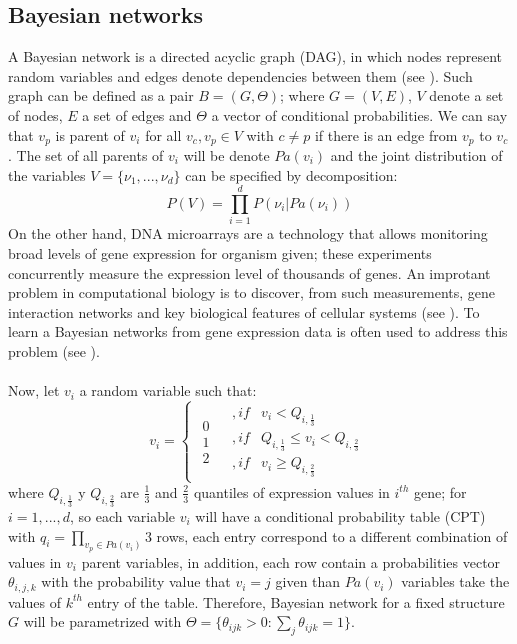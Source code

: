 \documentclass{bmcart}
\begin{document}
\subsection*{Bayesian networks}
A Bayesian network is a directed acyclic graph (DAG), in which nodes represent random variables and edges denote dependencies between them (see \cite{Pearl:1988:PRI:52121,pmid23375235}).  Such graph can be defined as a pair $B=(G,\Theta)$; where $G=(V,E)$, $V$ denote a set of nodes, $E$ a set of edges and $\Theta$ a vector of conditional probabilities. We can say that $v_{p}$ is parent of $v_{i}$ for all $v_{c},v_{p}\in V$ with $c\neq p$ if there is an edge from $v_{p}$ to $v_{c}$. The set of all parents of $v_{i}$ will be denote $Pa(v_{i})$ and the joint distribution of the variables $V=\{\nu_{1},...,\nu_{d}\}$ can be specified by decomposition:
\begin{equation}
P(V)=\prod_{i=1}^{d}P(\nu_{i}|Pa(\nu_{i}))\label{eq:1}
\end{equation}
On the other hand, DNA microarrays are a technology that allows monitoring broad levels of gene expression for organism given; these experiments concurrently measure the expression level of thousands of genes. An improtant problem in computational biology is to discover, from such measurements, gene interaction networks and key biological features of cellular systems (see \cite{dey2010bayesian}). To learn a Bayesian networks from gene expression data is often used to address this problem (see \cite{Pearl:1988:PRI:52121}).\\
\\
Now, let $v_{i}$ a random variable such that:
\[
v_{i}=\begin{cases}
\begin{array}{c}
0\\
1\\
2
\end{array} & \begin{array}{cc}
,if & v_{i}<Q_{i,\frac{1}{3}}\\
,if & Q_{i,\frac{1}{3}}\leq v_{i}<Q_{i,\frac{2}{3}}\\
,if & v_{i}\geq Q_{i,\frac{2}{3}}
\end{array}\end{cases}
\]
where $Q_{i,\frac{1}{3}}$ y $Q_{i,\frac{2}{3}}$ are $\frac{1}{3}$
and $\frac{2}{3}$ quantiles of expression values in $i^{th}$ gene;
for $i=1,...,d$, so each variable $v_{i}$ will have a conditional probability table (CPT) with $q_{i}=\prod_{v_{p}\in Pa(v_{i})}3$ rows, each entry correspond to a different combination of values in $v_{i}$ parent variables, in addition, each row contain a probabilities vector $\theta_{i,j,k}$ with the probability value that $v_{i}=j$ given than $Pa(v_{i})$ variables take the values of $k^{th}$ entry of the table. Therefore, Bayesian network for a fixed structure $G$ will be parametrized with $\Theta=\{\theta_{ijk}>0:\sum_{j}\theta_{ijk}=1\}$.
\end{document}
